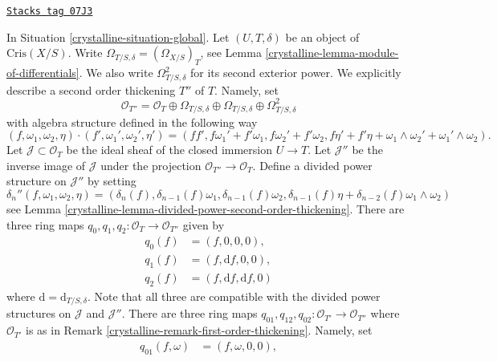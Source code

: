 \begin{remark}
\label{crystalline-remark-second-order-thickening}
\href{https://stacks.math.columbia.edu/tag/07J3}{\texttt{Stacks tag 07J3}}

In Situation \ref{crystalline-situation-global}.
Let $(U, T, \delta)$ be an object of $\text{Cris}(X/S)$.
Write $\Omega_{T/S, \delta} = (\Omega_{X/S})_T$, see
Lemma \ref{crystalline-lemma-module-of-differentials}.
We also write $\Omega^2_{T/S, \delta}$ for its second exterior
power. We explicitly describe a second order thickening $T''$ of $T$.
Namely, set
$$
\mathcal{O}_{T''} =
\mathcal{O}_T \oplus \Omega_{T/S, \delta} \oplus \Omega_{T/S, \delta}
\oplus \Omega^2_{T/S, \delta}
$$
with algebra structure defined in the following way
$$
(f, \omega_1, \omega_2, \eta) \cdot
(f', \omega_1', \omega_2', \eta') =
(ff', f\omega_1' + f'\omega_1, f\omega_2' + f'\omega_2,
f\eta' + f'\eta + \omega_1 \wedge \omega_2' + \omega_1' \wedge \omega_2).
$$
Let $\mathcal{J} \subset \mathcal{O}_T$
be the ideal sheaf of the closed immersion $U \to T$. Let
$\mathcal{J}''$ be the inverse image of $\mathcal{J}$ under the
projection $\mathcal{O}_{T''} \to \mathcal{O}_T$.
Define a divided power structure on $\mathcal{J}''$ by setting
$$
\delta_n''(f, \omega_1, \omega_2, \eta) =
(\delta_n(f), \delta_{n - 1}(f)\omega_1, \delta_{n - 1}(f)\omega_2,
\delta_{n - 1}(f)\eta + \delta_{n - 2}(f)\omega_1 \wedge \omega_2)
$$
see Lemma \ref{crystalline-lemma-divided-power-second-order-thickening}.
There are three ring maps
$q_0, q_1, q_2 : \mathcal{O}_T \to \mathcal{O}_{T''}$
given by
\begin{align*}
q_0(f) & = (f, 0, 0, 0), \\
q_1(f) & = (f, \text{d}f, 0, 0), \\
q_2(f) & = (f, \text{d}f, \text{d}f, 0)
\end{align*}
where $\text{d} = \text{d}_{T/S, \delta}$.
Note that all three are compatible with the divided power structures
on $\mathcal{J}$ and $\mathcal{J}''$. There are three ring maps
$q_{01}, q_{12}, q_{02} : \mathcal{O}_{T'} \to \mathcal{O}_{T''}$
where $\mathcal{O}_{T'}$ is as in Remark \ref{crystalline-remark-first-order-thickening}.
Namely, set
\begin{align*}
q_{01}(f, \omega) & = (f, \omega, 0, 0), \\

\end{align*}
\end{remark}
